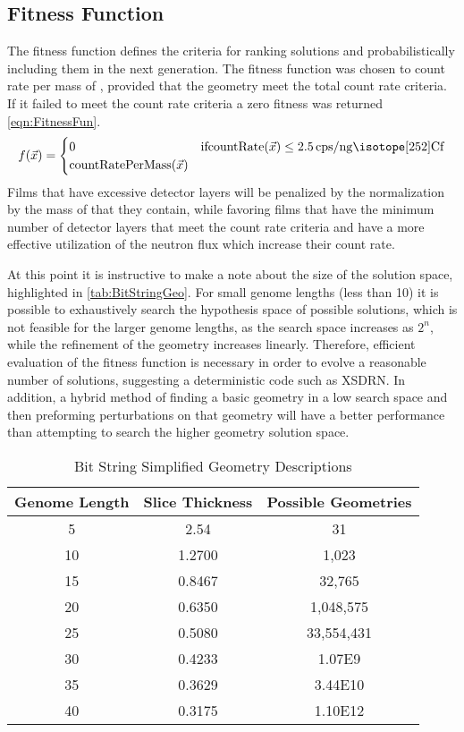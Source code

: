\subsection{Fitness Function}
\label{sec:FitnessFunc}
The fitness function defines the criteria for ranking solutions and probabilistically including them in the next generation.
The fitness function was chosen to count rate per mass of , provided that the geometry meet the total count rate criteria.
If it failed to meet the count rate criteria a zero fitness was returned \eqref{eqn:FitnessFun}.
\begin{align}
    \label{eqn:FitnessFun}
    f(\vec{x})
    = \begin{cases}
    0 & \text{if} \text{countRate}(\vec{x}) \leq \SI{2.5}{cps\per\nano\gram\iso[252]{Cf}} \\
    \text{countRatePerMass}(\vec{x})
    \end{cases}
\end{align}
Films that have excessive detector layers will be penalized by the normalization by the mass of  that they contain, while favoring films that have the minimum number of detector layers that meet the count rate criteria and have a more effective utilization of the neutron flux which increase their count rate.

At this point it is instructive to make a note about the size of the solution space, highlighted in  \autoref{tab:BitStringGeo}.
For small genome lengths (less than 10) it is possible to exhaustively search the hypothesis space of possible solutions, which is not feasible for the larger genome lengths, as the search space increases as $2^n$, while the refinement of the geometry increases linearly.
Therefore, efficient evaluation of the fitness function is necessary in order to evolve a reasonable number of solutions, suggesting a deterministic code such as XSDRN.
In addition, a hybrid method of finding a basic geometry in a low search space and then preforming perturbations on that geometry will have a better performance than attempting to search the higher geometry solution space.
\begin{table}
    \caption[Genome Bit String Geometries]{Bit String Simplified Geometry Descriptions}
    \label{tab:BitStringGeo}
    \centering
    \begin{tabular}{ c | c c}
     \toprule
     Genome Length&Slice Thickness&Possible Geometries \\
     \midrule
        5&2.54&31\\
        10&1.2700&1,023\\
        15&0.8467&32,765\\
        20&0.6350&1,048,575\\
        25&0.5080&33,554,431\\
        30&0.4233&\num{1.07E9}\\
        35&0.3629&\num{3.44E10}\\
        40&0.3175&\num{1.10E12}\\
    \bottomrule
    \end{tabular}
\end{table}

